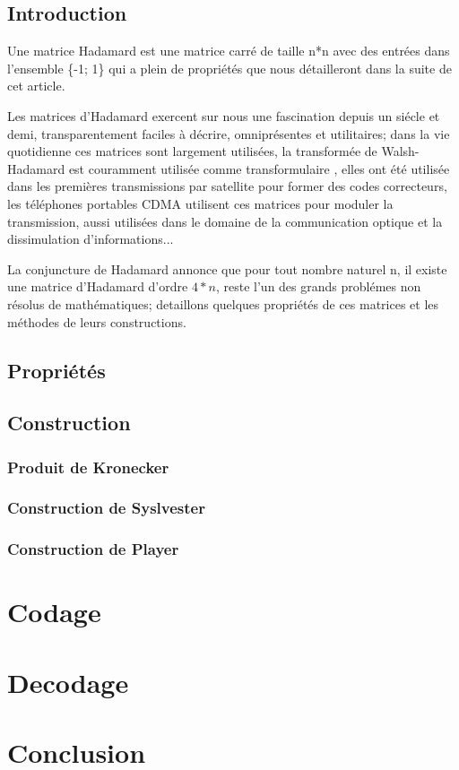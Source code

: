 \documentclass{article}
\begin{document}
\subsection{Introduction}
Une matrice Hadamard est une matrice carré de taille n*n avec des entrées 
dans l'ensemble \{-1; 1\} qui a plein de propriétés que nous détailleront 
dans la suite de cet article.

Les matrices d'Hadamard exercent sur nous une fascination depuis un siécle
et demi, transparentement faciles à décrire, omniprésentes et utilitaires;
dans la vie quotidienne ces matrices sont largement utilisées, la 
transformée de Walsh-Hadamard est couramment utilisée comme transformulaire
, elles ont été utilisée dans les premières transmissions par satellite 
pour former des codes correcteurs, les téléphones portables CDMA utilisent 
ces matrices pour moduler la transmission, aussi utilisées dans le domaine
de la communication optique et la dissimulation d'informations...

La conjuncture de Hadamard annonce que pour tout nombre naturel n, il 
existe une matrice d'Hadamard d'ordre $4*n$, reste l'un des grands 
problémes non résolus de mathématiques; detaillons quelques propriétés de 
ces matrices et les méthodes de leurs constructions.

\subsection{Propriétés}

\subsection{Construction}

\subsubsection{Produit de Kronecker}

\subsubsection{Construction de Syslvester}

\subsubsection{Construction de Player}

\section{Codage}

\section{Decodage}

\section{Conclusion}
\end{document}
